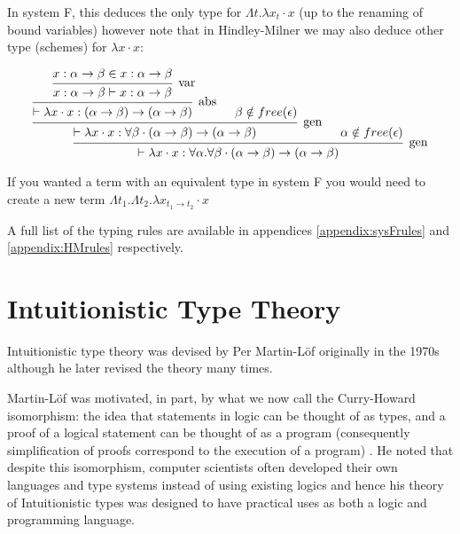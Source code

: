 \documentclass{ProgressReport}[2020/09/15]
\begin{document}
            In system F, this deduces the only type for $\Lambda t . \lambda x_t
            \cdot x$ (up to the renaming of bound variables) however note that
            in Hindley-Milner we may also deduce other type (schemes)
            for $\lambda x \cdot x$: 
            
            \[\begin{array}{c}
            \mbox{\begin{prooftree}
                        \hypo{x : \alpha \to \beta \in x : \alpha \to \beta}
                    \infer1[var]{x : \alpha \to \beta \vdash x : \alpha \to \beta}   
                    \infer1[abs]{\vdash \lambda x \cdot x : (\alpha \to \beta) \to
                    (\alpha \to \beta)}
                    \hypo{\beta \notin free(\epsilon)}        
                \infer2[gen]{\vdash \lambda x \cdot x : \forall \beta \cdot
                  (\alpha \to \beta) \to (\alpha \to \beta)}
                \hypo{\alpha \notin free(\epsilon)}
               \infer2[gen]{\vdash \lambda x \cdot x : \forall \alpha . \forall
                 \beta \cdot (\alpha \to \beta) \to (\alpha \to \beta)}
            \end{prooftree}}
            \end{array} \]
                                   
            If you wanted a term with an equivalent type in system F you would
            need to create a new term $\Lambda t_1 . \Lambda t_2 . \lambda x_{t_1
              \to t_2} \cdot x$
            
            A full list of the typing rules are available in
            appendices \ref{appendix:sysFrules} and
            \ref{appendix:HMrules} respectively. 
                    
          \section{Intuitionistic Type Theory}
        
          Intuitionistic type theory was devised by Per Martin-Löf
          \cite{martinlof1980} originally in the 1970s although he
          later revised the theory many times.

          Martin-Löf was motivated, in part, by what we now call the
          Curry-Howard isomorphism: the idea that statements in logic can be
          thought of as types, and a proof of a logical statement can
          be thought of as a program (consequently simplification of
          proofs correspond to the execution of a program)
          \cite{wadler2015}. He noted that despite this isomorphism,
          computer scientists often developed their own
          languages and type systems instead of using existing
          logics and hence his theory of Intuitionistic types was
          designed to have practical uses as both a logic and
          programming language.
\end{document}
